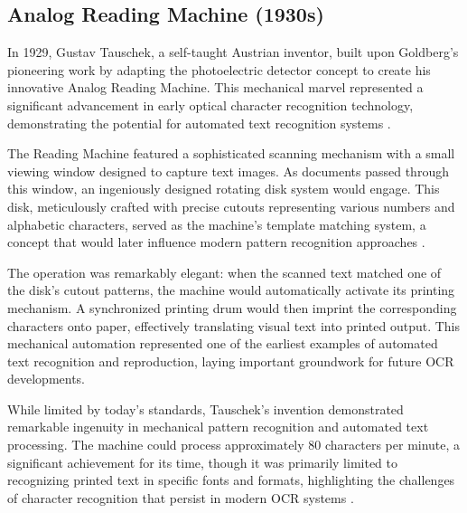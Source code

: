 \subsection{Analog Reading Machine (1930s)}
\label{sec:analog-reading}

In 1929, Gustav Tauschek, a self-taught Austrian inventor, built upon Goldberg's pioneering work
by adapting the photoelectric detector concept to create his innovative Analog Reading Machine. 
This mechanical marvel represented a significant advancement in early optical character recognition
technology, demonstrating the potential for automated text recognition systems \cite{diem2010recognizing}.

The Reading Machine featured a sophisticated scanning mechanism with a small viewing window designed
to capture text images. As documents passed through this window, an ingeniously designed 
rotating disk system would engage. This disk, meticulously crafted with precise cutouts 
representing various numbers and alphabetic characters, served as the machine's template matching system,
a concept that would later influence modern pattern recognition approaches \cite{diem2010recognizing}.

The operation was remarkably elegant: when the scanned text matched one of the disk's cutout patterns, 
the machine would automatically activate its printing mechanism. A synchronized printing drum would 
then imprint the corresponding characters onto paper, effectively translating visual text into printed 
output. This mechanical automation represented one of the earliest examples of automated text 
recognition and reproduction, laying important groundwork for future OCR developments.

While limited by today's standards, Tauschek's invention demonstrated remarkable ingenuity 
in mechanical pattern recognition and automated text processing. The machine could process 
approximately 80 characters per minute, a significant achievement for its time, though it was 
primarily limited to recognizing printed text in specific fonts and formats, highlighting the 
challenges of character recognition that persist in modern OCR systems \cite{diem2010recognizing}.

